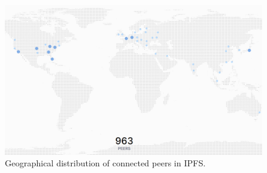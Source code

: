 \begin{figure}[htbp]
\centerline{\includegraphics[width=\textwidth]{figs/ipfs_peers.png}}
\caption{Geographical distribution of connected peers in IPFS.}
\label{fig:ipfs_peers}
\end{figure}
